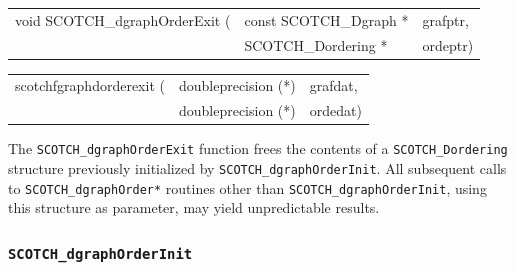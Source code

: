 \begin{itemize}
\progsyn

{\tt\begin{tabular}{l@{}ll}
void SCOTCH\_dgraphOrderExit ( & const SCOTCH\_Dgraph * & grafptr, \\
                               & SCOTCH\_Dordering *    & ordeptr)
\end{tabular}}

{\tt\begin{tabular}{l@{}ll}
scotchfgraphdorderexit ( & doubleprecision (*) & grafdat, \\
                         & doubleprecision (*) & ordedat)
\end{tabular}}

\progdes

The {\tt SCOTCH\_dgraphOrderExit} function frees the contents of a
{\tt SCOTCH\_\lbt Dordering} structure previously initialized by
{\tt SCOTCH\_\lbt dgraph\lbt Order\lbt Init}. All subsequent calls to
{\tt SCOTCH\_\lbt dgraph\lbt Order*} routines other than
{\tt SCOTCH\_\lbt dgraph\lbt Order\lbt Init}, using this structure
as parameter, may yield unpredictable results.
\end{itemize}

\subsubsection{{\tt SCOTCH\_dgraphOrderInit}}
\label{sec-lib-func-dgraphorderinit}

